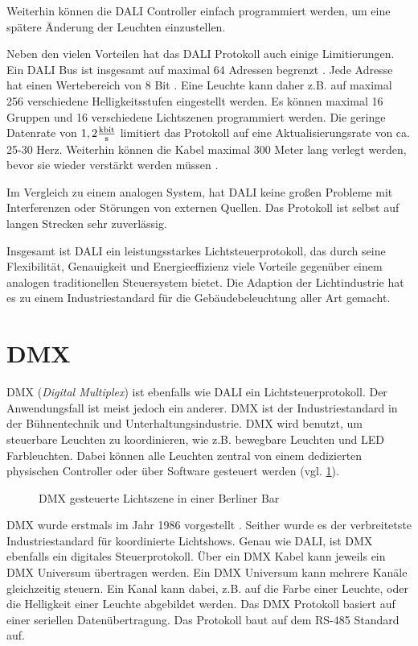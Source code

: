 Weiterhin können die DALI Controller einfach programmiert werden, um eine spätere Änderung der Leuchten einzustellen.

Neben den vielen Vorteilen hat das DALI Protokoll auch einige Limitierungen. Ein DALI Bus ist insgesamt auf maximal 64 Adressen begrenzt \cite[S.7]{DALI_Handbuch}. Jede Adresse hat einen Wertebereich von 8 Bit \cite[S.1]{DALI-Lichtmanagement}. Eine Leuchte kann daher z.B. auf maximal 256 verschiedene Helligkeitsstufen eingestellt werden. Es können maximal 16 Gruppen und 16 verschiedene Lichtszenen programmiert werden. Die geringe Datenrate von $1,2 \frac{\SI{}{\kilo\bit}}{\SI{}{\s}}$ limitiert das Protokoll auf eine Aktualisierungsrate von ca. 25-30 Herz. Weiterhin können die Kabel maximal 300 Meter lang verlegt werden, bevor sie wieder verstärkt werden müssen \cite[S.3]{DALI_Handbuch}. 

Im Vergleich zu einem analogen System, hat DALI keine großen Probleme mit Interferenzen oder Störungen von externen Quellen. Das Protokoll ist selbst auf langen Strecken sehr zuverlässig.

Insgesamt ist DALI ein leistungsstarkes Lichtsteuerprotokoll, das durch seine Flexibilität, Genauigkeit und Energieeffizienz viele Vorteile gegenüber einem analogen traditionellen Steuersystem bietet. Die Adaption der Lichtindustrie hat es zu einem Industriestandard für die Gebäudebeleuchtung aller Art gemacht.

\section{DMX}

DMX (\emph{Digital Multiplex}) ist ebenfalls wie DALI ein Lichtsteuerprotokoll. Der Anwendungsfall ist meist jedoch ein anderer. DMX ist der Industriestandard in der Bühnentechnik und Unterhaltungsindustrie. DMX wird benutzt, um steuerbare Leuchten zu koordinieren, wie z.B. bewegbare Leuchten und LED Farbleuchten. Dabei können alle Leuchten zentral von einem dedizierten physischen Controller oder über Software gesteuert werden (vgl. \ref{fig:dmx_use_example}).


\begin{figure}[H]
	\centering
	\caption{DMX gesteuerte Lichtszene in einer Berliner Bar}
	\label{fig:dmx_use_example}
\end{figure}


DMX wurde erstmals im Jahr 1986 vorgestellt \cite[S.5, ch. 2.1]{DMX101-Handbook}. Seither wurde es der verbreitetste Industriestandard für koordinierte Lichtshows. Genau wie DALI, ist DMX ebenfalls ein digitales Steuerprotokoll. Über ein DMX Kabel kann jeweils ein DMX Universum übertragen werden. Ein DMX Universum kann mehrere Kanäle gleichzeitig steuern. Ein Kanal kann dabei, z.B. auf die Farbe einer Leuchte, oder die Helligkeit einer Leuchte abgebildet werden. Das DMX Protokoll basiert auf einer seriellen Datenübertragung. Das Protokoll baut auf dem RS-485 Standard\cite[S.11, ch. 3.2]{DMX101-Handbook} auf.

